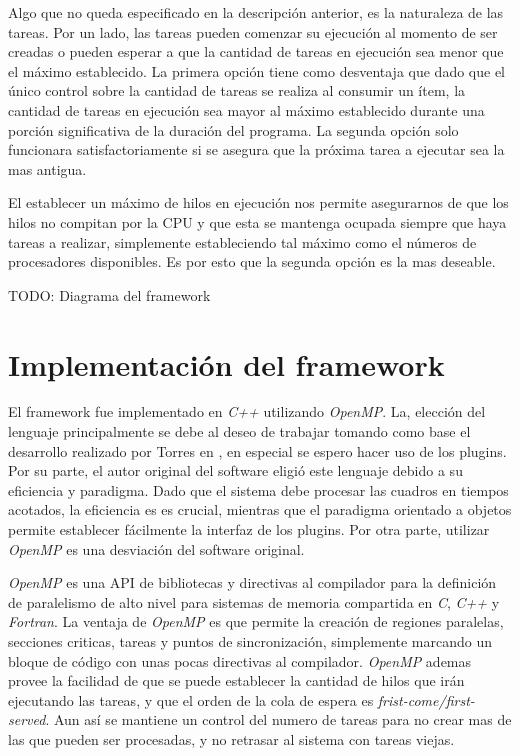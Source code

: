 Algo que no queda especificado en la descripción anterior, es la naturaleza de
las tareas. Por un lado, las tareas pueden comenzar su ejecución al momento de
ser creadas o pueden esperar a que la cantidad de tareas en ejecución sea menor
que el máximo establecido. La primera opción tiene como desventaja que dado que
el único control sobre la cantidad de tareas se realiza al consumir un ítem, la
cantidad de tareas en ejecución sea mayor al máximo establecido durante una
porción significativa de la duración del programa. La segunda opción solo
funcionara satisfactoriamente si se asegura que la próxima tarea a ejecutar sea
la mas antigua.

El establecer un máximo de hilos en ejecución nos permite asegurarnos de que los
hilos no compitan por la CPU y que esta se mantenga ocupada siempre que haya
tareas a realizar, simplemente estableciendo tal máximo como el números de
procesadores disponibles. Es por esto que la segunda opción es la mas deseable.

TODO: Diagrama del framework

\section{Implementación del framework}

El framework fue implementado en \emph{C++} utilizando \emph{OpenMP}. La,
elección del lenguaje principalmente se debe al deseo de trabajar tomando como
base el desarrollo realizado por Torres en \cite{torres2014}, en especial se
espero hacer uso de los plugins. Por su parte, el autor original del software
eligió este lenguaje debido a su eficiencia y paradigma. Dado que el sistema
debe procesar las cuadros en tiempos acotados, la eficiencia es es crucial,
mientras que el paradigma orientado a objetos permite establecer fácilmente la
interfaz de los plugins. Por otra parte, utilizar \emph{OpenMP} es una
desviación del software original.

\emph{OpenMP} es una API de bibliotecas y directivas al compilador para la
definición de paralelismo de alto nivel para sistemas de memoria compartida en
\emph{C}, \emph{C++} y \emph{Fortran}\cite{ompWeb}. La ventaja de \emph{OpenMP}
es que permite la creación de regiones paralelas, secciones criticas, tareas y
puntos de sincronización, simplemente marcando un bloque de código con unas
pocas directivas al compilador. \emph{OpenMP} ademas provee la facilidad de que
se puede establecer la cantidad de hilos que irán ejecutando las tareas, y que
el orden de la cola de espera es \emph{frist-come/first-served}. Aun así se
mantiene un control del numero de tareas para no crear mas de las que pueden ser
procesadas, y no retrasar al sistema con tareas viejas.

